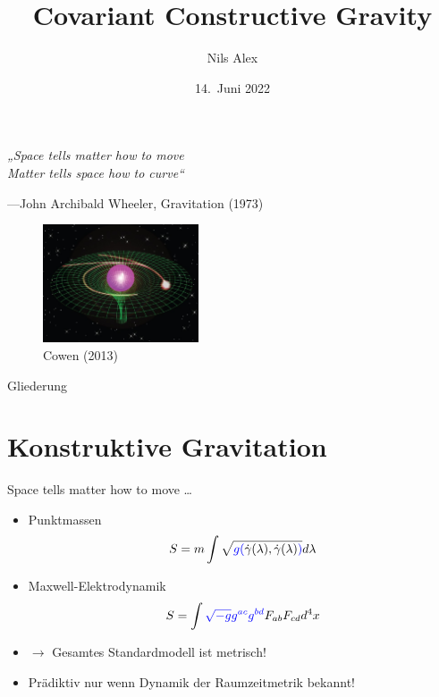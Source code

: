 \documentclass{beamer}
\title{Covariant Constructive Gravity}
\date{14.\ Juni 2022}
\author{Nils Alex}
\institute{FAU Erlangen-Nürnberg}
\begin{document}
    \maketitle

    \begin{frame}{}
        \vspace{12ex}
        \Large
        \textit{„Space tells matter how to move \\
        Matter tells space how to curve“}

        \normalsize
        ---John Archibald Wheeler, Gravitation (1973)

        \begin{figure}
            \hspace{14ex}
            \includegraphics[height=3.5cm]{curvature}
            \vspace{-1ex}
            \caption*{\scriptsize \lbrack Cowen (2013)\rbrack}
            \label{fig:figure}
        \end{figure}
    \end{frame}

    \begin{frame}{Gliederung}
        \tableofcontents[pausesections]
    \end{frame}


    \section{Konstruktive Gravitation}\label{sec:constructive-gravity}

    \begin{frame}{Space tells matter how to move \ldots}
        \begin{itemize}
            \item Punktmassen
            \[ S = m \int \sqrt{{\color{blue}g(}\dot\gamma(\lambda),\dot\gamma(\lambda){\color{blue})}} d\lambda \]
            \item Maxwell-Elektrodynamik
            \[ S = \int {\color{blue}\sqrt{-g}g^{ac}g^{bd}} F_{ab} F_{cd} d^4 x \]
            \item $\rightarrow$ Gesamtes Standardmodell ist metrisch!
            \item Prädiktiv nur wenn Dynamik der Raumzeitmetrik bekannt!
        \end{itemize}
    \end{frame}
\end{document}
